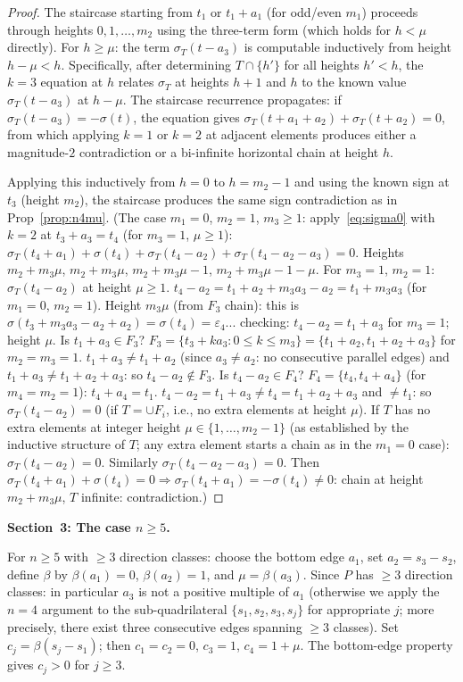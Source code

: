 \documentclass{article}
\begin{document}
\begin{proof}
The staircase starting from $t_1$ or $t_1+a_1$ (for odd/even $m_1$) proceeds through heights
$0,1,\dots,m_2$ using the three-term form (which holds for $h<\mu$ directly).
For $h\ge\mu$: the term $\sigma_T(t-a_3)$ is computable inductively from height $h-\mu<h$.
Specifically, after determining $T\cap\{h'\}$ for all heights $h'<h$, the $k=3$ equation at
$h$ relates $\sigma_T$ at heights $h+1$ and $h$ to the known value $\sigma_T(t-a_3)$ at $h-\mu$.
The staircase recurrence propagates: if $\sigma_T(t-a_3)=-\sigma(t)$, the equation gives
$\sigma_T(t+a_1+a_2)+\sigma_T(t+a_2)=0$, from which applying $k=1$ or $k=2$ at adjacent elements
produces either a magnitude-$2$ contradiction or a bi-infinite horizontal chain at height $h$.

Applying this inductively from $h=0$ to $h=m_2-1$ and using the known sign at $t_3$ (height $m_2$),
the staircase produces the same sign contradiction as in Prop~\ref{prop:n4mu}.
(The case $m_1=0$, $m_2=1$, $m_3\ge 1$: apply~\eqref{eq:sigma0} with $k=2$ at $t_3+a_3=t_4$
(for $m_3=1$, $\mu\ge 1$): $\sigma_T(t_4+a_1)+\sigma(t_4)+\sigma_T(t_4-a_2)+\sigma_T(t_4-a_2-a_3)=0$.
Heights $m_2+m_3\mu$, $m_2+m_3\mu$, $m_2+m_3\mu-1$, $m_2+m_3\mu-1-\mu$.
For $m_3=1$, $m_2=1$: $\sigma_T(t_4-a_2)$ at height $\mu\ge 1$.
$t_4-a_2=t_1+a_2+m_3a_3-a_2=t_1+m_3a_3$ (for $m_1=0$, $m_2=1$).
Height $m_3\mu$ (from $F_3$ chain): this is $\sigma(t_3+m_3a_3-a_2+a_2)=\sigma(t_4)=\varepsilon_4$... checking: $t_4-a_2=t_1+a_3$ for $m_3=1$; height $\mu$.  Is $t_1+a_3\in F_3$? $F_3=\{t_3+ka_3:0\le k\le m_3\}=\{t_1+a_2,t_1+a_2+a_3\}$ for $m_2=m_3=1$.  $t_1+a_3\ne t_1+a_2$ (since $a_3\ne a_2$: no consecutive parallel edges) and $t_1+a_3\ne t_1+a_2+a_3$: so $t_4-a_2\notin F_3$.  Is $t_4-a_2\in F_4$?  $F_4=\{t_4,t_4+a_4\}$ (for $m_4=m_2=1$): $t_4+a_4=t_1$.  $t_4-a_2=t_1+a_3\ne t_4=t_1+a_2+a_3$ and $\ne t_1$: so $\sigma_T(t_4-a_2)=0$ (if $T=\cup F_i$, i.e., no extra elements at height $\mu$).
If $T$ has no extra elements at integer height $\mu\in\{1,\dots,m_2-1\}$ (as established by the
inductive structure of $T$; any extra element starts a chain as in the $m_1=0$ case):
$\sigma_T(t_4-a_2)=0$.
Similarly $\sigma_T(t_4-a_2-a_3)=0$.
Then $\sigma_T(t_4+a_1)+\sigma(t_4)=0 \Rightarrow \sigma_T(t_4+a_1)=-\sigma(t_4)\ne 0$:
chain at height $m_2+m_3\mu$, $T$ infinite: contradiction.)
\end{proof}

\bigskip
\noindent\textbf{Section~3: The case $n\ge 5$.}

For $n\ge 5$ with $\ge 3$ direction classes: choose the bottom edge $a_1$, set $a_2=s_3-s_2$,
define $\beta$ by $\beta(a_1)=0$, $\beta(a_2)=1$, and $\mu=\beta(a_3)$.
Since $P$ has $\ge 3$ direction classes: in particular $a_3$ is not a positive multiple of $a_1$
(otherwise we apply the $n=4$ argument to the sub-quadrilateral $\{s_1,s_2,s_3,s_j\}$ for
appropriate $j$; more precisely, there exist three consecutive edges spanning $\ge 3$ classes).
Set $c_j=\beta(s_j-s_1)$; then $c_1=c_2=0$, $c_3=1$, $c_4=1+\mu$.
The bottom-edge property gives $c_j>0$ for $j\ge 3$.
\end{document}
